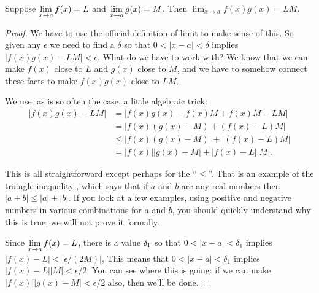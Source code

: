 \begin{theorem} Suppose $\displaystyle \lim_{x\to a} f(x)=L$ and $\displaystyle \lim_{x\to a}g(x)=M$. Then
\hfill\break
$\lim_{x\to a} f(x)g(x) = LM$.
\end{theorem}

\begin{proof} We have to use the official definition of limit to make sense
of this. So given any $\epsilon$ we need to find a $\delta$ so that
$0<|x-a|<\delta$ implies $|f(x)g(x)-LM|<\epsilon$. What do we have to
work with? We know that we can make $f(x)$ close to $L$ and $g(x)$
close to $M$, and we have to somehow connect these facts to make
$f(x)g(x)$ close to $LM$.

We use, as is so often the case, a little algebraic
trick: 
\begin{align*}
|f(x)g(x)-LM|&= |f(x)g(x)-f(x)M+f(x)M-LM| \\
&=|f(x)(g(x)-M)+(f(x)-L)M| \\
&\le |f(x)(g(x)-M)|+|(f(x)-L)M| \\
&=|f(x)||g(x)-M|+|f(x)-L||M|.
\end{align*}

This is all straightforward except perhaps for the ``$\le$''. That is
an example of the {\dfont triangle inequality%
}, 
which says that if $a$ and $b$ are any real
numbers then $|a+b|\le |a|+|b|$. If you look at a few examples, using
positive and negative numbers in various combinations for $a$ and $b$,
you should quickly understand why this is true; we will not prove it
formally. 

Since $\displaystyle \lim_{x\to a}f(x) =L$, there is a value $\displaystyle \delta_1$ so that
$0<|x-a|<\delta_1$ implies $|f(x)-L|<|\epsilon/(2M)|$, 
This means that $0<|x-a|<\delta_1$ implies
$|f(x)-L||M|< \epsilon/2$. You can see where this is going: if we can
make $|f(x)||g(x)-M|<\epsilon/2$ also, then we'll be done.


\end{proof}
